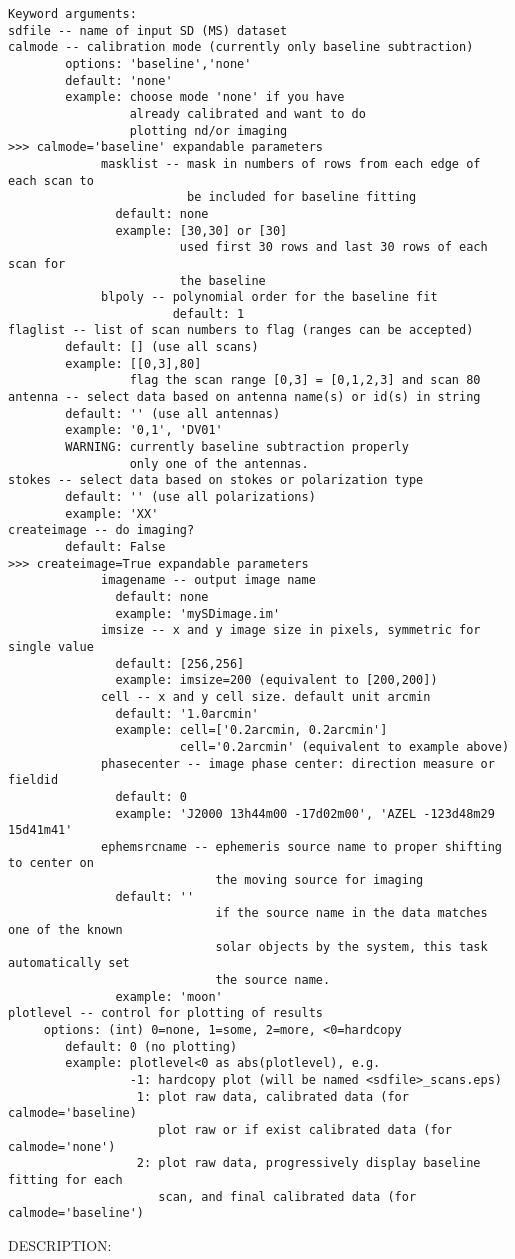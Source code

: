 \begin{verbatim}
Keyword arguments:
sdfile -- name of input SD (MS) dataset
calmode -- calibration mode (currently only baseline subtraction)
        options: 'baseline','none'
        default: 'none'
        example: choose mode 'none' if you have
                 already calibrated and want to do
                 plotting nd/or imaging 
>>> calmode='baseline' expandable parameters
             masklist -- mask in numbers of rows from each edge of each scan to 
                         be included for baseline fitting
               default: none
               example: [30,30] or [30] 
                        used first 30 rows and last 30 rows of each scan for 
                        the baseline 
             blpoly -- polynomial order for the baseline fit
                       default: 1
flaglist -- list of scan numbers to flag (ranges can be accepted)  
        default: [] (use all scans)
        example: [[0,3],80]
                 flag the scan range [0,3] = [0,1,2,3] and scan 80 
antenna -- select data based on antenna name(s) or id(s) in string
        default: '' (use all antennas)
        example: '0,1', 'DV01'
        WARNING: currently baseline subtraction properly 
                 only one of the antennas.
stokes -- select data based on stokes or polarization type 
        default: '' (use all polarizations)
        example: 'XX'
createimage -- do imaging? 
        default: False 
>>> createimage=True expandable parameters
             imagename -- output image name
               default: none
               example: 'mySDimage.im'
             imsize -- x and y image size in pixels, symmetric for single value
               default: [256,256]
               example: imsize=200 (equivalent to [200,200])
             cell -- x and y cell size. default unit arcmin
               default: '1.0arcmin'
               example: cell=['0.2arcmin, 0.2arcmin']
                        cell='0.2arcmin' (equivalent to example above)
             phasecenter -- image phase center: direction measure or fieldid 
               default: 0
               example: 'J2000 13h44m00 -17d02m00', 'AZEL -123d48m29 15d41m41'
             ephemsrcname -- ephemeris source name to proper shifting to center on 
                             the moving source for imaging
               default: ''
                             if the source name in the data matches one of the known 
                             solar objects by the system, this task automatically set 
                             the source name. 
               example: 'moon' 
plotlevel -- control for plotting of results
     options: (int) 0=none, 1=some, 2=more, <0=hardcopy
        default: 0 (no plotting)
        example: plotlevel<0 as abs(plotlevel), e.g.
                 -1: hardcopy plot (will be named <sdfile>_scans.eps)
                  1: plot raw data, calibrated data (for calmode='baseline)
                     plot raw or if exist calibrated data (for calmode='none')
                  2: plot raw data, progressively display baseline fitting for each 
                     scan, and final calibrated data (for calmode='baseline')  

\end{verbatim}
DESCRIPTION:

